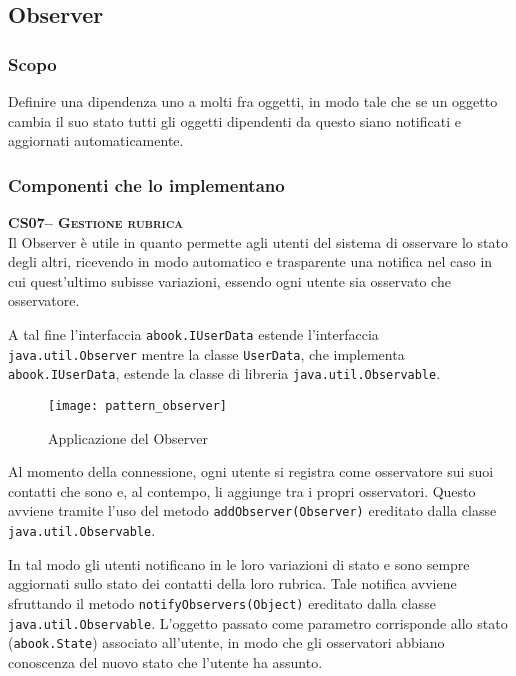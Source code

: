 \subsection{Observer}

\subsubsection{Scopo}
Definire una dipendenza uno a molti fra oggetti, in modo tale che se un oggetto cambia il suo stato tutti gli oggetti dipendenti da questo siano notificati e aggiornati automaticamente.

\subsubsection{Componenti che lo implementano}
\begin{description}
  \item{\scshape\bfseries CS07-- Gestione rubrica}\\
Il  Observer è utile in quanto permette agli utenti del sistema di osservare lo stato degli altri, ricevendo in modo automatico e trasparente una notifica nel caso in cui quest'ultimo subisse variazioni, essendo ogni utente sia osservato che osservatore.

A tal fine l'interfaccia \texttt{abook.IUserData} estende l'interfaccia \texttt{java.util.Observer} mentre la classe \texttt{UserData}, che implementa \texttt{abook.IUserData},  estende la classe di libreria \texttt{java.util.Observable}.

\begin{figure}[H]
  \centering
  \texttt{[image: pattern\_observer]}
  \caption{Applicazione del  Observer}\label{fig:observer}
\end{figure}

Al momento della connessione, ogni utente si registra come osservatore sui suoi contatti che sono  e, al contempo, li aggiunge tra i propri osservatori. Questo avviene tramite l'uso del metodo \texttt{addObserver(Observer)} ereditato dalla classe \texttt{java.util.Observable}.


In tal modo gli utenti notificano in  le loro variazioni di stato e sono sempre aggiornati sullo stato dei contatti della loro rubrica. Tale notifica avviene sfruttando il metodo \texttt{notifyObservers(Object)} ereditato dalla classe \texttt{java.util.Observable}. L'oggetto passato come parametro corrisponde allo stato (\texttt{abook.State}) associato all'utente, in modo che gli osservatori abbiano conoscenza del nuovo stato che l'utente ha assunto.

\end{description}


